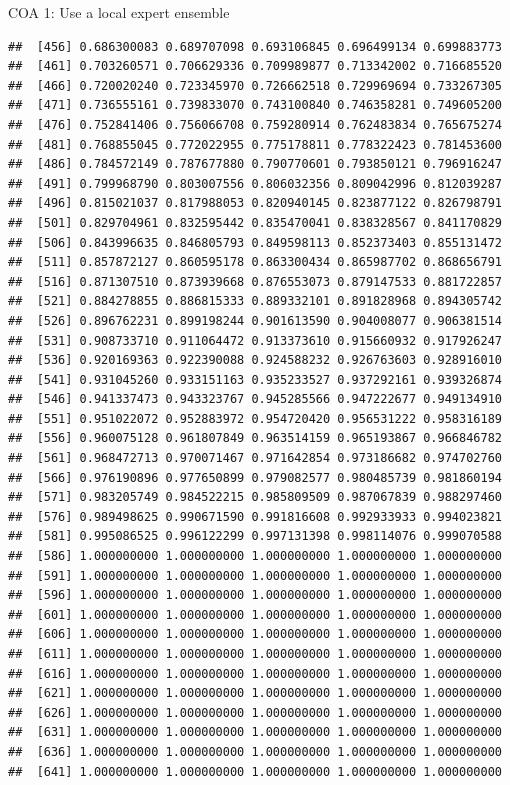\documentclass[ignorenonframetext,]{beamer}
\begin{document}
\begin{frame}[fragile]{COA 1: Use a local expert ensemble}
\begin{verbatim}
##  [456] 0.686300083 0.689707098 0.693106845 0.696499134 0.699883773
##  [461] 0.703260571 0.706629336 0.709989877 0.713342002 0.716685520
##  [466] 0.720020240 0.723345970 0.726662518 0.729969694 0.733267305
##  [471] 0.736555161 0.739833070 0.743100840 0.746358281 0.749605200
##  [476] 0.752841406 0.756066708 0.759280914 0.762483834 0.765675274
##  [481] 0.768855045 0.772022955 0.775178811 0.778322423 0.781453600
##  [486] 0.784572149 0.787677880 0.790770601 0.793850121 0.796916247
##  [491] 0.799968790 0.803007556 0.806032356 0.809042996 0.812039287
##  [496] 0.815021037 0.817988053 0.820940145 0.823877122 0.826798791
##  [501] 0.829704961 0.832595442 0.835470041 0.838328567 0.841170829
##  [506] 0.843996635 0.846805793 0.849598113 0.852373403 0.855131472
##  [511] 0.857872127 0.860595178 0.863300434 0.865987702 0.868656791
##  [516] 0.871307510 0.873939668 0.876553073 0.879147533 0.881722857
##  [521] 0.884278855 0.886815333 0.889332101 0.891828968 0.894305742
##  [526] 0.896762231 0.899198244 0.901613590 0.904008077 0.906381514
##  [531] 0.908733710 0.911064472 0.913373610 0.915660932 0.917926247
##  [536] 0.920169363 0.922390088 0.924588232 0.926763603 0.928916010
##  [541] 0.931045260 0.933151163 0.935233527 0.937292161 0.939326874
##  [546] 0.941337473 0.943323767 0.945285566 0.947222677 0.949134910
##  [551] 0.951022072 0.952883972 0.954720420 0.956531222 0.958316189
##  [556] 0.960075128 0.961807849 0.963514159 0.965193867 0.966846782
##  [561] 0.968472713 0.970071467 0.971642854 0.973186682 0.974702760
##  [566] 0.976190896 0.977650899 0.979082577 0.980485739 0.981860194
##  [571] 0.983205749 0.984522215 0.985809509 0.987067839 0.988297460
##  [576] 0.989498625 0.990671590 0.991816608 0.992933933 0.994023821
##  [581] 0.995086525 0.996122299 0.997131398 0.998114076 0.999070588
##  [586] 1.000000000 1.000000000 1.000000000 1.000000000 1.000000000
##  [591] 1.000000000 1.000000000 1.000000000 1.000000000 1.000000000
##  [596] 1.000000000 1.000000000 1.000000000 1.000000000 1.000000000
##  [601] 1.000000000 1.000000000 1.000000000 1.000000000 1.000000000
##  [606] 1.000000000 1.000000000 1.000000000 1.000000000 1.000000000
##  [611] 1.000000000 1.000000000 1.000000000 1.000000000 1.000000000
##  [616] 1.000000000 1.000000000 1.000000000 1.000000000 1.000000000
##  [621] 1.000000000 1.000000000 1.000000000 1.000000000 1.000000000
##  [626] 1.000000000 1.000000000 1.000000000 1.000000000 1.000000000
##  [631] 1.000000000 1.000000000 1.000000000 1.000000000 1.000000000
##  [636] 1.000000000 1.000000000 1.000000000 1.000000000 1.000000000
##  [641] 1.000000000 1.000000000 1.000000000 1.000000000 1.000000000

\end{verbatim}
\end{frame}
\end{document}
